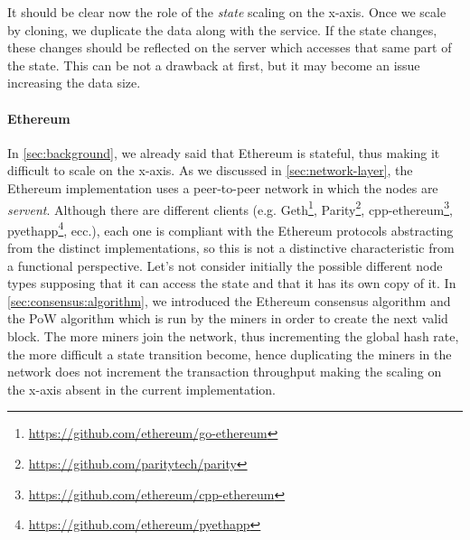 It should be clear now the role of the \emph{state} scaling on the x-axis. Once
we scale by cloning, we duplicate the data along with the service. If the state
changes, these changes should be reflected on the server which accesses that
same part of the state. This can be not a drawback at first, but it may become
an issue increasing the data size.

\paragraph{Ethereum}
In \autoref{sec:background}, we already said that Ethereum is stateful, thus
making it difficult to scale on the x-axis. As we discussed in
\autoref{sec:network-layer}, the Ethereum implementation uses a peer-to-peer
network in which the nodes are \emph{servent}. Although there are different
clients (e.g. Geth\footnote{\url{https://github.com/ethereum/go-ethereum}},
Parity\footnote{\url{https://github.com/paritytech/parity}},
cpp-ethereum\footnote{\url{https://github.com/ethereum/cpp-ethereum}},
pyethapp\footnote{\url{https://github.com/ethereum/pyethapp}}, ecc.), each one
is compliant with the Ethereum protocols abstracting from the distinct
implementations, so this is not a distinctive characteristic from a functional
perspective. Let's not consider initially the possible different node types
 supposing that it can access the state and that it has its
own copy of it. In \autoref{sec:consensus:algorithm}, we introduced the Ethereum
consensus algorithm and the PoW algorithm which is run by the miners in order to
create the next valid block. The more miners join the network, thus incrementing
the global hash rate, the more difficult a state transition become, hence
duplicating the miners in the network does not increment the transaction
throughput making the scaling on the x-axis absent in the current
implementation.




